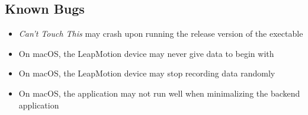 \documentclass[a4paper]{article}
\providecommand{\tightlist}{%
\setlength{\itemsep}{0pt}\setlength{\parskip}{0pt}}
\begin{document}
  \subsection{Known Bugs}
  \begin{itemize}
    \tightlist{}
    \item \textit{Can't Touch This} may crash upon running the release version
      of the exectable
    \item On macOS, the LeapMotion device may never give data to begin with
    \item On macOS, the LeapMotion device may stop recording data randomly
    \item On macOS, the application may not run well when minimalizing the
      backend application
  \end{itemize}
\end{document}

